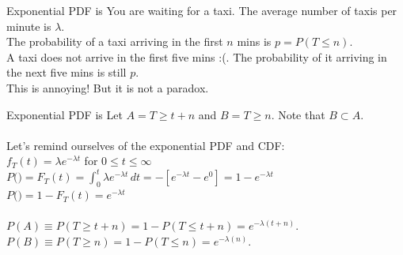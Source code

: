 \documentclass[10pt,sans,english,compress,xcolor=dvipsnames]{beamer}
\begin{document}
\begin{frame}[fragile]{Exponential PDF is  }
You are waiting for a taxi. The average number of taxis per minute is $\lambda$.\\[1ex]

The probability of a taxi arriving in the first $n$ mins is $p=P(T\leq n)$.\\[1ex]

A taxi does not arrive in the first five mins :(. The probability of it arriving in the next five mins is still $p$. \\[1ex]

This is annoying! But it is not a paradox. \\[1ex]

\end{frame}


\begin{frame}[fragile]{Exponential PDF is }
\small
Let $A = T\geq  t+n $ and $B = T \geq n$. Note that $B\subset A$.\\[2ex]
\\[1ex]

Let's remind ourselves of the exponential PDF and CDF:\\[1ex]
$f_T(t) = \lambda e^{-\lambda t} $ for $0\leq t \leq \infty$\\[1ex]
$P($$) = F_T(t) = \displaystyle \int_{0}^t  \lambda e^{-\lambda t} \,dt = - [e^{-\lambda t} - e^{0}] = 1 - e^{-\lambda t} $\\[1ex]
$P($$) = 1 - F_T(t) =  e^{-\lambda t} $\\[1ex]

\\

$P(A) \equiv P(T \geq t+n) = 1-P(T \leq t+n) = e^{-\lambda(t+n)}$.\\[1ex]
$P(B) \equiv P(T \geq n) = 1-P(T \leq n) = e^{-\lambda(n)}$.\\[1ex]





\end{frame}
\end{document}
